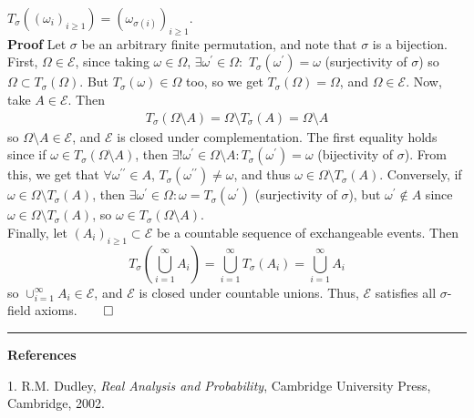 \documentclass[10pt]{article}
\newcommand{\bp}[1]{\left({#1}\right)}
\newcommand{\1}[1]{\mathbbm{1}_{#1}}
\newcommand{\mc}[1]{\mathcal{#1}}
\begin{document}
    $T_\sigma((\omega_i)_{i\geq 1})=(\omega_{\sigma(i)})_{i\geq 1}$.\\[5pt]
    {\bf Proof}\hspace{5pt} Let $\sigma$ be an arbitrary finite permutation, and note that $\sigma$ is a bijection. First, $\Omega\in\mc{E}$, since
    taking $\omega\in\Omega$, $\exists\omega^\prime\in\Omega:$ $T_\sigma(\omega^\prime)=\omega$ (surjectivity of $\sigma$) so $\Omega\subset T_\sigma(\Omega)$. But $T_\sigma(\omega)\in\Omega$ too, so we get $T_\sigma(\Omega)=\Omega$, and $\Omega\in\mc{E}$. Now, take $A\in\mc{E}$. Then
    \begin{align*}
        T_\sigma(\Omega\setminus A)=\Omega\setminus T_\sigma(A)=\Omega\setminus A
    \end{align*}
    so $\Omega\setminus A\in\mc{E}$, and $\mc{E}$ is closed under complementation. The first equality holds since if $\omega\in T_\sigma(\Omega\setminus A)$, then $\exists!\omega^\prime\in\Omega\setminus A:T_\sigma(\omega^\prime)=\omega$ (bijectivity of $\sigma$). From this, we get that $\forall \omega^{\prime\prime}\in A$, $T_\sigma(\omega^{\prime\prime})\neq\omega$, and thus $\omega\in\Omega\setminus T_\sigma(A)$.
    Conversely, if $\omega\in\Omega\setminus T_\sigma(A)$, then $\exists\omega^\prime\in\Omega:\omega= T_\sigma(\omega^\prime)$ (surjectivity of $\sigma$), but $\omega^\prime\notin A$ since $\omega\in\Omega\setminus T_\sigma(A)$, so $\omega\in T_\sigma(\Omega\setminus A)$.\\[5pt]
    Finally, let $(A_i)_{i\geq 1}\subset\mc{E}$ be a countable sequence of exchangeable events. Then
    \[T_\sigma\bp{\bigcup_{i=1}^\infty A_i}=\bigcup_{i=1}^\infty T_\sigma(A_i)=\bigcup_{i=1}^\infty A_i\]
    so $\cup_{i=1}^\infty A_i\in\mc{E}$, and $\mc{E}$ is closed under countable unions. Thus, $\mc{E}$ satisfies all $\sigma$-field axioms.\hfill{$\qed$}\\[5pt]
    \hrule
    \begin{center}
        {\bf\large References}
    \end{center}
    1. R.M. Dudley, {\it Real Analysis and Probability}, Cambridge University Press, Cambridge, 2002. \\[5pt]
\end{document}
